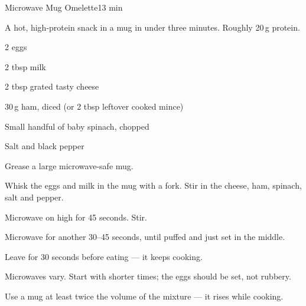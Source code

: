\begin{recipebox}{Microwave Mug Omelette}{1}{3 min}

A hot, high-protein snack in a mug in under three minutes. Roughly 20\,g
protein.

\begin{ingredients}
  \item 2 eggs
  \item 2 tbsp milk
  \item 2 tbsp grated tasty cheese
  \item 30\,g ham, diced (or 2 tbsp leftover cooked mince)
  \item Small handful of baby spinach, chopped
  \item Salt and black pepper
\end{ingredients}

\begin{method}
  \item Grease a large microwave-safe mug.
  \item Whisk the eggs and milk in the mug with a fork. Stir in the cheese, ham, spinach, salt and pepper.
  \item Microwave on high for 45 seconds. Stir.
  \item Microwave for another 30--45 seconds, until puffed and just set in the middle.
  \item Leave for 30 seconds before eating --- it keeps cooking.
\end{method}

\begin{notelist}
  \item Microwaves vary. Start with shorter times; the eggs should be set, not rubbery.
  \item Use a mug at least twice the volume of the mixture --- it rises while cooking.
\end{notelist}

\end{recipebox}
